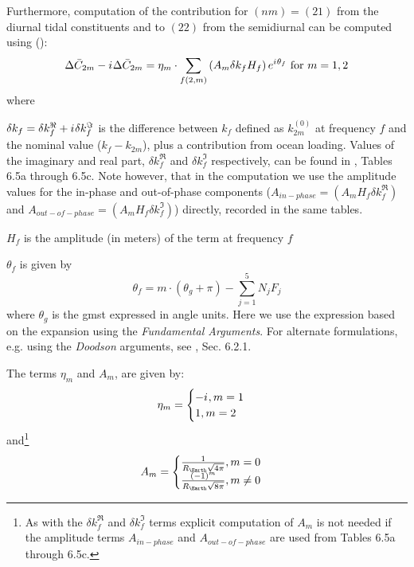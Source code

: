 Furthermore, computation of the contribution for $(nm)=(21)$ from the 
diurnal tidal constituents and to $(22)$ from the semidiurnal can be computed using 
(\cite{iers2010}):
\begin{equation}
  \Delta \bar{C}_{2m} - {i\mkern1mu} \Delta \bar{C}_{2m} = 
    \eta _m \cdot \sum _{f(2,m)} \left( A_m \delta k_f H_f\right) e^{{i\mkern1mu} \theta _f} 
    \text{ for } m=1,2
  \label{eq:iers1068b}
\end{equation}
where 
\begin{description}
  \item $\delta k_f = \delta k^\Re _f + {i\mkern1mu} \delta k^\Im _f$ is the difference 
    between $k_f$ defined as $k^{(0)}_{2m}$ at frequency $f$ and the 
    nominal value ($k_f - k_{2m}$), plus a contribution from ocean 
    loading. Values of the imaginary and real part, $\delta k^\Re _f$ and 
    $\delta k^\Im _f$ respectively, can be found in \cite{iers2010}, Tables 6.5a 
    through 6.5c. Note however, that in the computation we use the amplitude values 
    for the in-phase and out-of-phase components ($A_{in-phase} = \left(A_m H_f \delta k^\Re _f \right)$ 
    and $A_{out-of-phase} = \left( A_m H_f \delta k^\Im _f \right)$) directly, recorded 
    in the same tables.
  \item $H_f$ is the amplitude (in meters) of the term at frequency $f$
  \item $\theta _f$ is given by 
    \begin{equation} \theta _f = m \cdot ( \theta _g + \pi ) - \sum ^5_{j=1} N_j F_j \end{equation}
    where $\theta _g$ is the \gls{gmst} expressed in angle units.
    Here we use the expression based on the expansion using the \emph{Fundamental Arguments}. 
    For alternate formulations, e.g. using the \emph{Doodson} arguments, see 
    \cite{iers2010}, Sec. 6.2.1.
  \item The terms $\eta _m$ and $A_m$, are given by: 
    \begin{equation}
    \eta _m = 
      \begin{cases} -{i\mkern1mu} , m=1 \\ 1 , m=2\end{cases}
    \end{equation} and\footnote{As with the $\delta k^\Re _f$ and $\delta k^\Im _f$ terms 
    explicit computation of $A_m$ is not needed if the 
    amplitude terms $A_{in-phase}$ and $A_{out-of-phase}$ are used from 
    \cite{iers2010} Tables 6.5a through 6.5c.}
    \begin{equation} 
      A_m = \begin{cases} 
          \frac{1}{R_{\Earth}\sqrt{4 \pi}}, m=0\\
          \frac{(-1)^m}{R_{\Earth}\sqrt{8 \pi}}, m \ne 0
      \end{cases}
    \end{equation}
\end{description}

